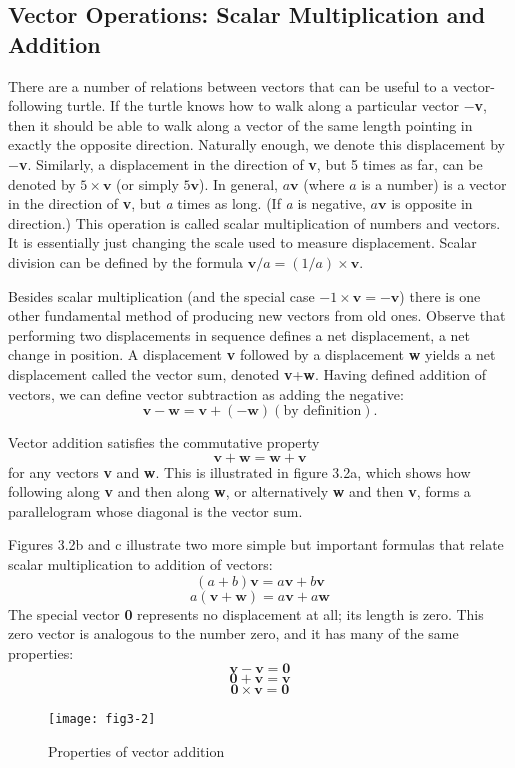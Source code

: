 \documentclass{book}
\begin{document}
\subsection{Vector Operations: Scalar Multiplication and Addition}

There are a number of relations between vectors that can be useful
to a vector-following turtle. If the turtle knows how to walk along a
particular vector $-$\textbf{v}, then it should be able to walk along a vector of
the same length pointing in exactly the opposite direction. Naturally
enough, we denote this displacement by $-$\textbf{v}. Similarly, a displacement
in the direction of \textbf{v}, but 5 times as far, can be denoted by $5 \times \textbf{v}$ (or simply
$5\textbf{v}$). In general, $a\textbf{v}$ (where $a$ is a number) is a vector in the direction of \textbf{v},
but {\em a} times as long. (If {\em a} is negative, $a\textbf{v}$ is opposite in direction.) This
operation is called scalar multiplication of numbers and vectors. It is
essentially just changing the scale used to measure displacement. Scalar
division can be defined by the formula $\textbf{v}/a = (1 / a) \times \mathbf{v}$.

Besides scalar multiplication (and the special case $-1 \times \textbf{v} = -\textbf{v}$)
there is one other fundamental method of producing new vectors from
old ones. Observe that performing two displacements in sequence defines
a net displacement, a net change in position. A displacement \textbf{v} followed
by a displacement \textbf{w} yields a net displacement called the vector sum,
denoted \textbf{v}+\textbf{w}. Having defined addition of vectors, we can define vector
subtraction as adding the negative:
$$\textbf{v} - \textbf{w} = \textbf{v} + (-\textbf{w}) (\text{by definition}).$$

Vector addition satisfies the commutative property
$$\textbf{v} + \textbf{w} = \textbf{w} + \textbf{v}$$
\noindent for any vectors \textbf{v} and \textbf{w}. This is illustrated in figure 3.2a, which shows
how following along \textbf{v} and then along \textbf{w}, or alternatively \textbf{w} and then \textbf{v},
forms a parallelogram whose diagonal is the vector sum.

Figures 3.2b and c illustrate two more simple but important formulas
that relate scalar multiplication to addition of vectors:
$$(a+b)\textbf{v}=a\textbf{v}+b\textbf{v}$$
$$a(\textbf{v} + \textbf{w}) = a\textbf{v} + a\textbf{w}$$
\noindent The special vector \textbf{0} represents no displacement at all; its length is
zero. This zero vector is analogous to the number zero, and it has many
of the same properties:
$$\textbf{v} - \textbf{v} = \textbf{0}$$
$$\textbf{0} + \textbf{v} = \textbf{v}$$
$$\textbf{0} \times \textbf{v} = \textbf{0}$$
\begin{figure}
\begin{center}
\texttt{[image: fig3-2]}
\caption{Properties of vector addition}
\end{center}
\end{figure}
\end{document}
